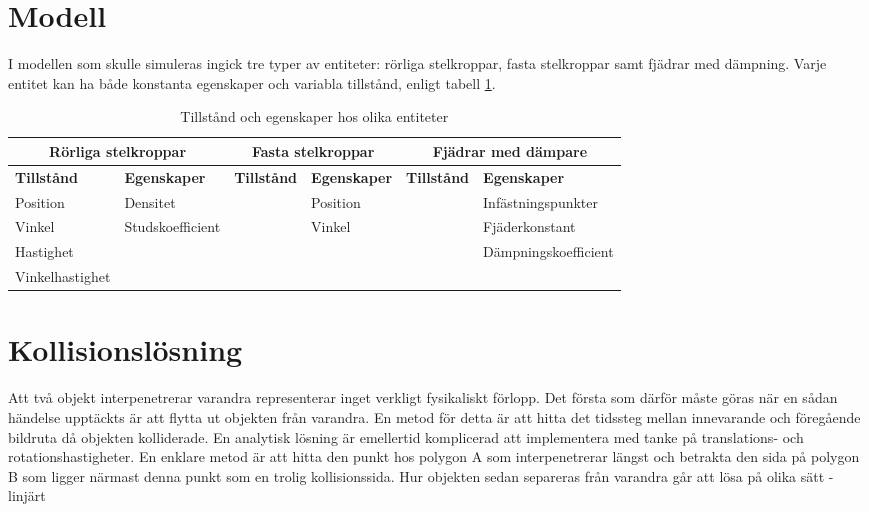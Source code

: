 \documentclass[a4paper,12pt,twopage,swedish]{article}
\begin{document}

\section{Modell}
I modellen som skulle simuleras ingick tre typer av entiteter: rörliga stelkroppar, fasta stelkroppar samt fjädrar med dämpning. Varje entitet kan ha både konstanta egenskaper och variabla tillstånd, enligt tabell \ref{table:states_and_properties}.

\begin{table}[!htp]
	\caption{Tillstånd och egenskaper hos olika entiteter}
	\label{table:states_and_properties}
	\renewcommand{\arraystretch}{1.5}
	\begin{tabular}{|p{1cm}|p{1cm}|p{1cm}|p{1cm}|p{1cm}|p{1cm}|}
		\hline
			\multicolumn{2}{|c|}{\textbf{Rörliga stelkroppar}} & \multicolumn{2}{|c|}{\textbf{Fasta stelkroppar}} & \multicolumn{2}{|c|}{\textbf{Fjädrar med dämpare}} \\
		\hline
			\textbf{Tillstånd} & \textbf{Egenskaper} & \textbf{Tillstånd} & \textbf{Egenskaper} & \textbf{Tillstånd} & \textbf{Egenskaper} \\
		\hline
			Position & Densitet & & Position & & Infästnings\-punkter \\
			Vinkel & Studs\-koefficient & & Vinkel & & Fjäder\-konstant \\
			Hastighet & & & & & Dämpnings\-koefficient \\
			Vinkel\-hastighet & & & & & {} \\
		\hline
	\end{tabular}
\end{table}












\clearpage \clearpage








\section{Kollisionslösning}
	Att två objekt interpenetrerar varandra representerar inget verkligt fysikaliskt förlopp. Det första som därför måste göras när en sådan händelse upptäckts är att flytta ut objekten från varandra. En metod för detta är att hitta det tidssteg mellan innevarande och föregående bildruta då objekten kolliderade. En analytisk lösning är emellertid komplicerad att implementera med tanke på translations- och rotationshastigheter. En enklare metod är att hitta den punkt hos polygon A som interpenetrerar längst och betrakta den sida på polygon B som ligger närmast denna punkt som en trolig kollisionssida. Hur objekten sedan separeras från varandra går att lösa på olika sätt - linjärt 
\end{document}
